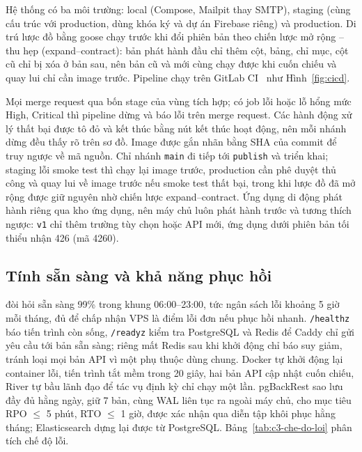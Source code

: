Hệ thống có ba môi trường: local (Compose, Mailpit thay SMTP), staging (cùng cấu trúc với production, dùng khóa ký và dự án Firebase riêng) và production. Di trú lược đồ bằng goose chạy trước khi đổi phiên bản theo chiến lược mở rộng -- thu hẹp (expand--contract): bản phát hành đầu chỉ thêm cột, bảng, chỉ mục, cột cũ chỉ bị xóa ở bản sau, nên bản cũ và mới cùng chạy được khi cuốn chiếu và quay lui chỉ cần image trước. Pipeline chạy trên GitLab CI~\cite{gitlabci} như Hình~\ref{fig:cicd}.


Mọi merge request qua bốn stage của vùng tích hợp; có job lỗi hoặc lỗ hổng mức High, Critical thì pipeline dừng và báo lỗi trên merge request. Các hành động xử lý thất bại được tô đỏ và kết thúc bằng nút kết thúc hoạt động, nên mỗi nhánh dừng đều thấy rõ trên sơ đồ. Image được gắn nhãn bằng SHA của commit để truy ngược về mã nguồn. Chỉ nhánh \texttt{main} đi tiếp tới \texttt{publish} và triển khai; staging lỗi smoke test thì chạy lại image trước, production cần phê duyệt thủ công và quay lui về image trước nếu smoke test thất bại, trong khi lược đồ đã mở rộng được giữ nguyên nhờ chiến lược expand--contract. Ứng dụng di động phát hành riêng qua kho ứng dụng, nên máy chủ luôn phát hành trước và tương thích ngược: \texttt{v1} chỉ thêm trường tùy chọn hoặc API mới, ứng dụng dưới phiên bản tối thiểu nhận 426 (mã 4260).

\subsection{Tính sẵn sàng và khả năng phục hồi}\label{ssec:san-sang-phuc-hoi}

 đòi hỏi sẵn sàng 99\% trong khung 06:00--23:00, tức ngân sách lỗi khoảng 5 giờ mỗi tháng, đủ để chấp nhận VPS là điểm lỗi đơn nếu phục hồi nhanh. \texttt{/healthz} báo tiến trình còn sống, \texttt{/readyz} kiểm tra PostgreSQL và Redis để Caddy chỉ gửi yêu cầu tới bản sẵn sàng; riêng mất Redis sau khi khởi động chỉ báo suy giảm, tránh loại mọi bản API vì một phụ thuộc dùng chung. Docker tự khởi động lại container lỗi, tiến trình tắt mềm trong 20 giây, hai bản API cập nhật cuốn chiếu, River tự bầu lãnh đạo để tác vụ định kỳ chỉ chạy một lần. pgBackRest sao lưu đầy đủ hằng ngày, giữ 7 bản, cùng WAL liên tục ra ngoài máy chủ, cho mục tiêu RPO $\le$ 5 phút, RTO $\le$ 1 giờ, được xác nhận qua diễn tập khôi phục hằng tháng; Elasticsearch dựng lại được từ PostgreSQL. Bảng~\ref{tab:c3-che-do-loi} phân tích chế độ lỗi.

